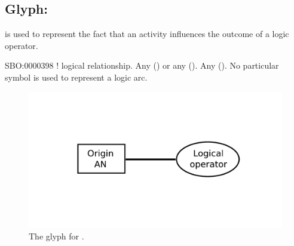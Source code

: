 
\subsection{Glyph:  }\label{sec:logicArc}

 is used to represent the fact that an activity influences the outcome of a logic operator.

\begin{glyphDescription}
 \glyphSboTerm SBO:0000398 ! logical relationship.
 \glyphOrigin Any  () or any  ().
 \glyphTarget Any  ().
 \glyphEndPoint No particular symbol is used to represent a logic arc.
 \end{glyphDescription}

\begin{figure}[H]
  \centering
  \includegraphics[scale = 0.4]{images/logicArc}
  \caption{The \AF glyph for .}
  \label{fig:logicArc}
\end{figure}
